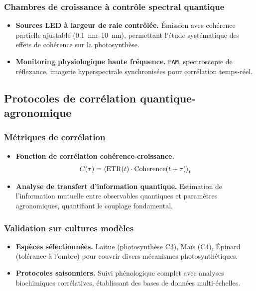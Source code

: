 \documentclass[12pt, a4paper]{article}
\begin{document}
\subsubsection{Chambres de croissance à contrôle spectral quantique}

\begin{itemize}
    \item \textbf{Sources LED à largeur de raie contrôlée.} Émission avec cohérence partielle ajustable (\SIrange{0.1}{10}{\nano\meter}), permettant l'étude systématique des effets de cohérence sur la photosynthèse.
    
    \item \textbf{Monitoring physiologique haute fréquence.} \texttt{PAM}, spectroscopie de réflexance, imagerie hyperspectrale synchronisées pour corrélation temps-réel.
\end{itemize}

\subsection{Protocoles de corrélation quantique-agronomique}

\subsubsection{Métriques de corrélation}

\begin{itemize}
    \item \textbf{Fonction de corrélation cohérence-croissance.}
        \begin{equation}
            C(\tau) = \ev {\text{ETR}(t) \cdot \text{Coherence}(t+\tau)}_t
        \end{equation}
    
    \item \textbf{Analyse de transfert d'information quantique.} Estimation de l'information mutuelle entre observables quantiques et paramètres agronomiques, quantifiant le couplage fondamental.
\end{itemize}

\subsubsection{Validation sur cultures modèles}

\begin{itemize}
    \item \textbf{Espèces sélectionnées.} Laitue (photosynthèse C3), Maïs (C4), Épinard (tolérance à l'ombre) pour couvrir divers mécanismes photosynthétiques.
    
    \item \textbf{Protocoles saisonniers.} Suivi phénologique complet avec analyses biochimiques corrélatives, établissant des bases de données multi-échelles.
\end{itemize}
\end{document}
